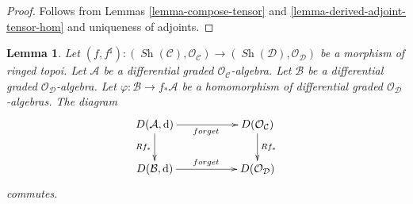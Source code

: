 \documentclass{stacks-project}
\theoremstyle{plain}
\newtheorem{lemma}[subsection]{Lemma}
\theoremstyle{definition}
\theoremstyle{remark}
\numberwithin{equation}{subsection}
\def\Sh{\mathop{\mathit{Sh}}\nolimits}
\begin{document}
\begin{proof}
Follows from Lemmas \ref{lemma-compose-tensor} and
\ref{lemma-derived-adjoint-tensor-hom}
and uniqueness of adjoints.
\end{proof}

\begin{lemma}
\label{lemma-pushforward-agrees}
Let $(f, f^\sharp) : (\Sh(\mathcal{C}), \mathcal{O}_\mathcal{C})
\to (\Sh(\mathcal{D}), \mathcal{O}_\mathcal{D})$
be a morphism of ringed topoi. Let $\mathcal{A}$ be a differential
graded $\mathcal{O}_\mathcal{C}$-algebra. Let $\mathcal{B}$ be a
differential graded $\mathcal{O}_\mathcal{D}$-algebra. Let
$\varphi : \mathcal{B} \to f_*\mathcal{A}$ be a homomorphism
of differential graded $\mathcal{O}_\mathcal{D}$-algebras.
The diagram
$$
\xymatrix{
D(\mathcal{A}, \text{d}) \ar[d]_{Rf_*} \ar[rr]_{forget} & &
D(\mathcal{O}_\mathcal{C}) \ar[d]^{Rf_*} \\
D(\mathcal{B}, \text{d}) \ar[rr]^{forget} & &
D(\mathcal{O}_\mathcal{D})
}
$$
commutes.
\end{lemma}
\end{document}
